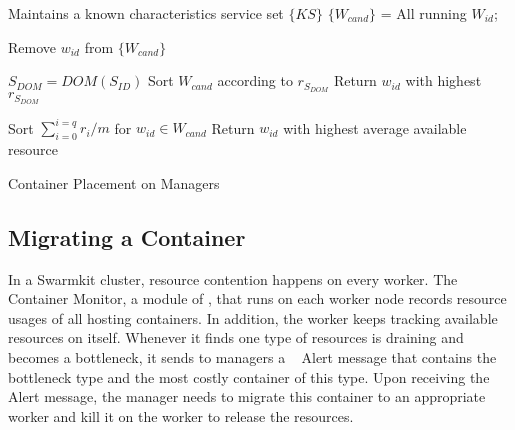 \begin{algorithm}[ht]
\begin{algorithmic}[1]
\STATE Maintains a known characteristics service set $\{KS\}$ 
\STATE $\{W_{cand}\}$ = All running $W_{id}$;

\STATE Remove $w_{id}$ from $\{W_{cand}\}$
\ENDIF
\ENDFOR

\STATE $S_{DOM} =  DOM(S_{ID})$
\STATE Sort $W_{cand}$ according to $r_{S_{DOM}}$
\STATE Return $w_{id}$ with highest $r_{S_{DOM}}$

\begin{comment}
  \IF {$S_{dom} = ``M''$}
  \STATE Sort $\{W_{cand}\}$ according to $W_{mem}$
  \STATE Return $W_{id}$ with highest $W_{mem}$
  
  \ELSIF {$S_{DOM} = ``C''$}
  \STATE Sort $\{W_{cand}\}$ according to $W_{cpu}$
  \STATE Return $W_{id}$ with highest $W_{cpu}$
  
  \ELSIF {$S_{dom} = ``N''$}
  \STATE Sort $\{W_{cand}\}$ according to $W_{net}$
  \STATE Return $W_{id}$ with highest $W_{net}$
  
  \ELSIF {$S_{dom} = ``IO''$}
  \STATE Sort $\{W_{cand}\}$ according to $W_{io}$
  \STATE Return $W_{id}$ with highest $W_{io}$  
  \ENDIF
\end{comment}

  \ELSE
  \STATE Sort $\sum_{i=0}^{i=q} r_i / m$ for $w_{id} \in W_{cand}$
  \STATE Return $w_{id}$ with highest average available resource
  
\ENDIF

\end{algorithmic}
\caption{Container Placement on Managers}
\label{alg:initial}
\end{algorithm}



\subsection{Migrating a Container}
In a Swarmkit cluster, resource contention happens on every worker.
The Container Monitor, a module of \sol, that runs on each worker node records resource usages of all hosting containers.
In addition, the worker keeps tracking available resources on itself. Whenever it finds one type of 
resources is draining and becomes a bottleneck, it sends to managers a \sol~ Alert message that contains the bottleneck type and the
most costly container of this type. Upon receiving the \sol~ Alert message, the manager needs 
to migrate this container to an appropriate worker and kill it on the worker to release the resources.

